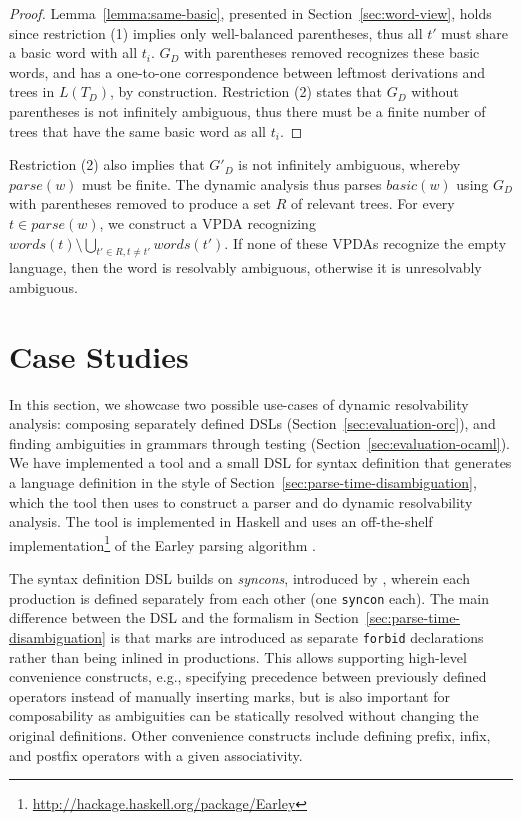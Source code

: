 \documentclass[acmsmall,review,anonymous]{acmart}\settopmatter{printfolios=true,printccs=false,printacmref=false}
\newcommand{\syncon}{\lstinline[language=syncon]}
\newcommand{\parse}{\mathit{parse}} %
\newcommand{\words}{\mathit{words}} %
\newcommand{\alt}{\mathit{alt}} %
\newcommand{\basic}{\mathit{basic}} %
\begin{document}
\begin{proof}
  Lemma~\ref{lemma:same-basic}, presented in Section~\ref{sec:word-view}, holds since restriction (1) implies only well-balanced parentheses, thus all $t'$ must share a basic word with all $t_i$. $G_D$ with parentheses removed recognizes these basic words, and has a one-to-one correspondence between leftmost derivations and trees in $L(T_D)$, by construction. Restriction (2) states that $G_D$ without parentheses is not infinitely ambiguous, thus there must be a finite number of trees that have the same basic word as all $t_i$.
\end{proof}

Restriction (2) also implies that $G'_D$ is not infinitely ambiguous, whereby $\parse(w)$ must be finite. The dynamic analysis thus parses $\basic(w)$ using $G_D$ with parentheses removed to produce a set $R$ of relevant trees. For every $t \in parse(w)$, we construct a VPDA recognizing $\words(t) \setminus \bigcup_{t' \in R, t \neq t'}\words(t')$. If none of these VPDAs recognize the empty language, then the word is resolvably ambiguous, otherwise it is unresolvably ambiguous.

\section{Case Studies} \label{sec:evaluation}

In this section, we showcase two possible use-cases of dynamic
resolvability analysis: composing separately defined DSLs
(Section~\ref{sec:evaluation-orc}), and finding ambiguities in
grammars through testing (Section~\ref{sec:evaluation-ocaml}).
%
We have implemented a tool and a small DSL for syntax definition
that generates a language definition in the style of
Section~\ref{sec:parse-time-disambiguation}, which the tool then
uses to construct a parser and do dynamic resolvability analysis.
The tool is implemented in Haskell and uses an off-the-shelf
implementation\footnote{\url{http://hackage.haskell.org/package/Earley}}
of the Earley parsing algorithm
\cite{earleyEfficientContextfreeParsing1970}.

The syntax definition DSL builds on \emph{syncons}, introduced by
\citet{palmkvistCreatingDomainSpecificLanguages2019}, wherein each
production is defined separately from each other (one
\syncon{syncon} each).
%
The main difference between the DSL and the formalism in
Section~\ref{sec:parse-time-disambiguation} is that marks are
introduced as separate \syncon{forbid} declarations rather than
being inlined in productions. This allows supporting high-level
convenience constructs, e.g., specifying precedence between
previously defined operators instead of manually inserting marks,
but is also important for composability as ambiguities can be
statically resolved without changing the original definitions.
Other convenience constructs include defining prefix, infix, and
postfix operators with a given associativity.
\end{document}
